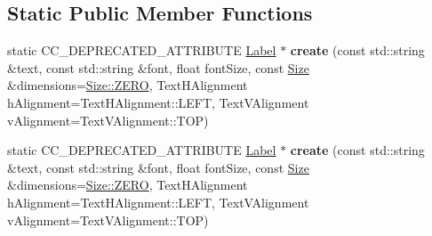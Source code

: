 \subsection*{Static Public Member Functions}
\begin{DoxyCompactItemize}
\item 
\mbox{\label{classLabel_a16f3e3ef7645ce9eef152ac87dd355db}} 
static C\+C\+\_\+\+D\+E\+P\+R\+E\+C\+A\+T\+E\+D\+\_\+\+A\+T\+T\+R\+I\+B\+U\+TE \hyperlink{classLabel}{Label} $\ast$ {\bfseries create} (const std\+::string \&text, const std\+::string \&font, float font\+Size, const \hyperlink{classSize}{Size} \&dimensions=\hyperlink{classSize_a724334f12c8ef877c36b3f69e1257aa7}{Size\+::\+Z\+E\+RO}, Text\+H\+Alignment h\+Alignment=Text\+H\+Alignment\+::\+L\+E\+FT, Text\+V\+Alignment v\+Alignment=Text\+V\+Alignment\+::\+T\+OP)
\item 
\mbox{\label{classLabel_a982da5a488673a7bf79a86f28b499a9d}} 
static C\+C\+\_\+\+D\+E\+P\+R\+E\+C\+A\+T\+E\+D\+\_\+\+A\+T\+T\+R\+I\+B\+U\+TE \hyperlink{classLabel}{Label} $\ast$ {\bfseries create} (const std\+::string \&text, const std\+::string \&font, float font\+Size, const \hyperlink{classSize}{Size} \&dimensions=\hyperlink{classSize_a724334f12c8ef877c36b3f69e1257aa7}{Size\+::\+Z\+E\+RO}, Text\+H\+Alignment h\+Alignment=Text\+H\+Alignment\+::\+L\+E\+FT, Text\+V\+Alignment v\+Alignment=Text\+V\+Alignment\+::\+T\+OP)
\end{DoxyCompactItemize}
